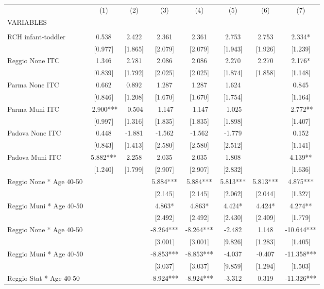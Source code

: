 \begin{tabular}{lccccccc} \hline
 & (1) & (2) & (3) & (4) & (5) & (6) & (7) \\
VARIABLES &  &  &  &  &  &  &  \\ \hline
 &  &  &  &  &  &  &  \\
RCH infant-toddler & 0.538 & 2.422 & 2.361 & 2.361 & 2.753 & 2.753 & 2.334* \\
 & [0.977] & [1.865] & [2.079] & [2.079] & [1.943] & [1.926] & [1.239] \\
Reggio None ITC & 1.346 & 2.781 & 2.086 & 2.086 & 2.270 & 2.270 & 2.176* \\
 & [0.839] & [1.792] & [2.025] & [2.025] & [1.874] & [1.858] & [1.148] \\
Parma None ITC & 0.662 & 0.892 & 1.287 & 1.287 & 1.624 &  & 0.845 \\
 & [0.846] & [1.208] & [1.670] & [1.670] & [1.754] &  & [1.164] \\
Parma Muni ITC & -2.900*** & -0.504 & -1.147 & -1.147 & -1.025 &  & -2.772** \\
 & [0.997] & [1.316] & [1.835] & [1.835] & [1.898] &  & [1.407] \\
Padova None ITC & 0.448 & -1.881 & -1.562 & -1.562 & -1.779 &  & 0.152 \\
 & [0.843] & [1.413] & [2.580] & [2.580] & [2.512] &  & [1.141] \\
Padova Muni ITC & 5.882*** & 2.258 & 2.035 & 2.035 & 1.808 &  & 4.139** \\
 & [1.240] & [1.799] & [2.907] & [2.907] & [2.832] &  & [1.636] \\
Reggio None * Age 40-50 &  &  & 5.884*** & 5.884*** & 5.813*** & 5.813*** & 4.875*** \\
 &  &  & [2.145] & [2.145] & [2.062] & [2.044] & [1.327] \\
Reggio Muni * Age 40-50 &  &  & 4.863* & 4.863* & 4.424* & 4.424* & 4.274** \\
 &  &  & [2.492] & [2.492] & [2.430] & [2.409] & [1.779] \\
Reggio None * Age 40-50 &  &  & -8.264*** & -8.264*** & -2.482 & 1.148 & -10.644*** \\
 &  &  & [3.001] & [3.001] & [9.826] & [1.283] & [1.405] \\
Reggio Muni * Age 40-50 &  &  & -8.853*** & -8.853*** & -4.037 & -0.407 & -11.358*** \\
 &  &  & [3.037] & [3.037] & [9.859] & [1.294] & [1.503] \\
Reggio Stat * Age 40-50 &  &  & -8.924*** & -8.924*** & -3.312 & 0.319 & -11.326*** \\

\end{tabular}
